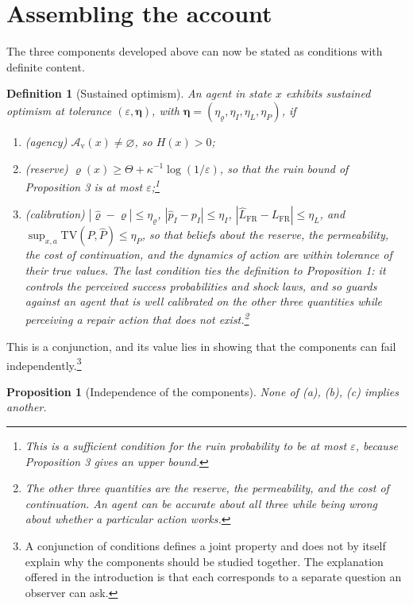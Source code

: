 \documentclass[11pt]{article}
\newtheorem{definition}{Definition}
\newtheorem{proposition}{Proposition}
\theoremstyle{remark}
\newcommand{\tv}{\mathrm{TV}}
\begin{document}
\section{Assembling the account}

The three components developed above can now be stated as conditions with definite content.

\begin{definition}[Sustained optimism]
An agent in state $x$ exhibits \emph{sustained optimism} at tolerance $(\varepsilon,\boldsymbol\eta)$, with $\boldsymbol\eta=(\eta_\varrho,\eta_I,\eta_L,\eta_P)$, if
\begin{enumerate}[label=(\alph*),nosep]
\item (agency) $\mathcal A_{\mathrm v}(x)\neq\varnothing$, so $H(x)>0$;
\item (reserve) $\varrho(x)\ge\Theta+\kappa^{-1}\log(1/\varepsilon)$, so that the ruin bound of Proposition 3 is at most $\varepsilon$;\footnote{This is a sufficient condition for the ruin probability to be at most $\varepsilon$, because Proposition 3 gives an upper bound.}
\item (calibration) $|\hat\varrho-\varrho|\le\eta_\varrho$, $|\hat p_I-p_I|\le\eta_I$, $|\hat L_{\mathrm{FR}}-L_{\mathrm{FR}}|\le\eta_L$, and $\sup_{x,a}\tv(P,\hat P)\le\eta_P$, so that beliefs about the reserve, the permeability, the cost of continuation, and the dynamics of action are within tolerance of their true values. The last condition ties the definition to Proposition 1: it controls the perceived success probabilities and shock laws, and so guards against an agent that is well calibrated on the other three quantities while perceiving a repair action that does not exist.\footnote{The other three quantities are the reserve, the permeability, and the cost of continuation. An agent can be accurate about all three while being wrong about whether a particular action works.}
\end{enumerate}
\end{definition}

This is a conjunction, and its value lies in showing that the components can fail independently.\footnote{A conjunction of conditions defines a joint property and does not by itself explain why the components should be studied together. The explanation offered in the introduction is that each corresponds to a separate question an observer can ask.}

\begin{proposition}[Independence of the components]
None of (a), (b), (c) implies another.
\end{proposition}
\end{document}
